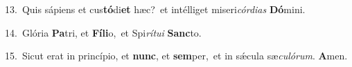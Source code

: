 {\numbfont\textcolor{\numbcolor}{13.}}~Quis sápiens et cus\-\textbf{tó}\-di\textbf{et} hæc?~\star et intélliget miseri\-\textit{cór}\-\textit{di}\textit{as} \textbf{Dó}\-mini.\par
{\numbfont\textcolor{\numbcolor}{14.}}~Glória \textbf{Pa}\-tri, et \textbf{Fí}\-\textbf{li}o,~\star et Spi\-\textit{rí}\-\textit{tu}\textit{i} \textbf{Sanc}\-to.\par
{\numbfont\textcolor{\numbcolor}{15.}}~Sicut erat in princípio, et \textbf{nunc}\-, et \textbf{sem}\-per,~\star et in sǽcula sæ\-\textit{cu}\-\textit{ló}\textit{rum}. \textbf{A}\-men.\par
